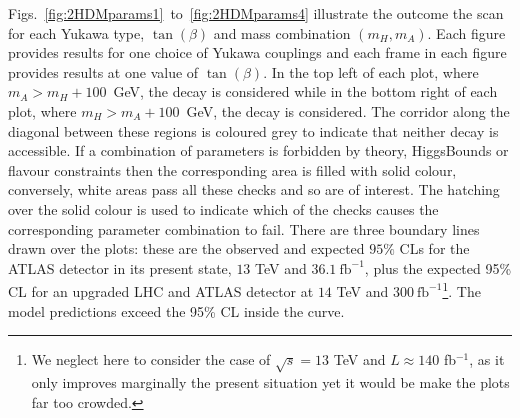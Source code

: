 Figs.~\ref{fig:2HDMparams1}~to~\ref{fig:2HDMparams4} illustrate the outcome the scan for each
Yukawa type, \(\tan(\beta)\) and mass combination $(m_H,m_A)$.
Each figure provides results for one choice of Yukawa couplings
and each frame in each figure provides results at one value of \(\tan(\beta)\).
In the top left of each plot, where \(m_A > m_H+100\)~GeV, the decay \AZH{} is considered while 
in the bottom right of each plot, where \(m_H > m_A+100\)~GeV,   the decay \HZA{} is considered.
The corridor along the diagonal between these regions is coloured grey to indicate that neither decay is accessible.
%
If a combination of parameters is forbidden by theory, HiggsBounds or flavour constraints
then the corresponding area is filled with solid colour, conversely,
white areas pass all these checks and so are of interest. The hatching over the solid colour is used to indicate which of the checks
causes the corresponding parameter combination to fail.
There are three boundary lines drawn over the plots: 
these are the observed and expected \(95\%\) CLs for the ATLAS detector in its present state, \(13\) TeV and \(36.1~\text{fb}^{-1}\),
plus the expected 95\% CL for an upgraded LHC and ATLAS detector at \(14\) TeV and \(300~\text{fb}^{-1}\)\footnote{We neglect here to consider the case of $\sqrt s=13$ TeV and $L\approx140$ fb$^{-1}$, as it only improves marginally the present situation yet it would be make the plots far too crowded.}.
The model predictions exceed the 95\% CL inside the curve.


